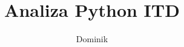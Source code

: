 \documentclass{beamer}
\title{\huge Analiza Python ITD}
\author{Dominik}
\institute{PW}
\begin{document}
\begin{frame}
\begin{columns}
\end{columns}
\end{frame}
\end{document}
